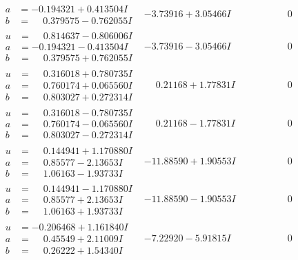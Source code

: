 \documentclass[1p]{elsarticle_modified}
\theoremstyle{definition}
\begin{document}
$$\begin{array}{c|c|c}
\begin{aligned}
a &= -0.194321 + 0.413504 I \\
b &= \phantom{-}0.379575 - 0.762055 I\end{aligned}
 & -3.73916 + 3.05466 I & \phantom{-0.000000 } 0 \\ \hline\begin{aligned}
u &= \phantom{-}0.814637 - 0.806006 I \\
a &= -0.194321 - 0.413504 I \\
b &= \phantom{-}0.379575 + 0.762055 I\end{aligned}
 & -3.73916 - 3.05466 I & \phantom{-0.000000 } 0 \\ \hline\begin{aligned}
u &= \phantom{-}0.316018 + 0.780735 I \\
a &= \phantom{-}0.760174 + 0.065560 I \\
b &= \phantom{-}0.803027 + 0.272314 I\end{aligned}
 & \phantom{-}0.21168 + 1.77831 I & \phantom{-0.000000 } 0 \\ \hline\begin{aligned}
u &= \phantom{-}0.316018 - 0.780735 I \\
a &= \phantom{-}0.760174 - 0.065560 I \\
b &= \phantom{-}0.803027 - 0.272314 I\end{aligned}
 & \phantom{-}0.21168 - 1.77831 I & \phantom{-0.000000 } 0 \\ \hline\begin{aligned}
u &= \phantom{-}0.144941 + 1.170880 I \\
a &= \phantom{-}0.85577 - 2.13653 I \\
b &= \phantom{-}1.06163 - 1.93733 I\end{aligned}
 & -11.88590 + 1.90553 I & \phantom{-0.000000 } 0 \\ \hline\begin{aligned}
u &= \phantom{-}0.144941 - 1.170880 I \\
a &= \phantom{-}0.85577 + 2.13653 I \\
b &= \phantom{-}1.06163 + 1.93733 I\end{aligned}
 & -11.88590 - 1.90553 I & \phantom{-0.000000 } 0 \\ \hline\begin{aligned}
u &= -0.206468 + 1.161840 I \\
a &= \phantom{-}0.45549 + 2.11009 I \\
b &= \phantom{-}0.26222 + 1.54340 I\end{aligned}
 & -7.22920 - 5.91815 I & \phantom{-0.000000 } 0 \\ \hline\begin{aligned}

\end{aligned}
\end{array}$$
\end{document}

